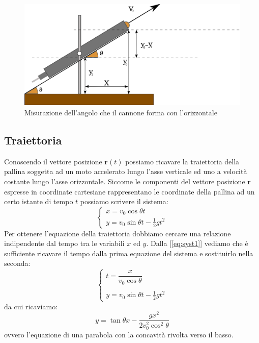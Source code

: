 \documentclass[a4paper,10pt,oneside]{article}
\begin{document}
\begin{figure}[H]
 \centering
 \includegraphics[width=\textwidth]{./Immagini/misura_angolo.png}
 \caption{Misurazione dell'angolo che il cannone forma con l'orizzontale}
 \label{fig:cannone4}
\end{figure}






\subsection*{Traiettoria}

Conoscendo il vettore posizione $\mathbf{r}(t)$ possiamo ricavare la traiettoria della pallina soggetta ad un moto accelerato lungo l'asse verticale ed uno a velocità costante lungo l'asse orizzontale. Siccome le componenti del vettore posizione $\mathbf{r}$ espresse in coordinate cartesiane rappresentano le coordinate della pallina ad un certo istante di tempo $t$ possiamo scrivere il sistema:
\begin{equation}\label{eq:syst1}
\begin{cases}
x=v_0\cos\theta t\\
y=v_0\sin\theta t-\frac{1}{2}gt^2
\end{cases}
\end{equation}
Per ottenere l'equazione della traiettoria dobbiamo cercare una relazione indipendente dal tempo tra le variabili $x$ ed $y$. Dalla [\ref{eq:syst1}] vediamo che è sufficiente ricavare il tempo dalla prima equazione del sistema e sostituirlo nella seconda:
\begin{equation}
\begin{cases}
t=\dfrac{x}{v_0\cos\theta}\\
\\
y=v_0\sin\theta t-\frac{1}{2}gt^2
\end{cases}
\end{equation}
da cui ricaviamo:
\begin{equation}
 y=\tan\theta x-\dfrac{gx^2}{2v_0^2\cos^2\theta}
\end{equation}
ovvero l'equazione di una parabola con la concavità rivolta verso il basso.
\end{document}
